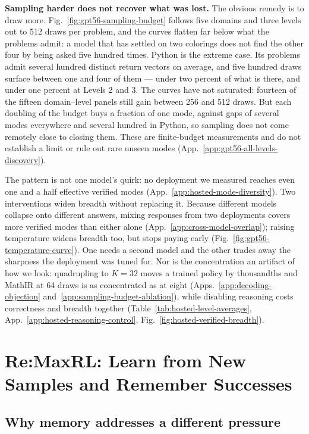 \documentclass{article}
\newcommand{\1}{\mathbf 1}
\theoremstyle{remark}
\theoremstyle{definition}
\theoremstyle{plain}
\begin{document}
\textbf{Sampling harder does not recover what was lost.}
The obvious remedy is to draw more. Fig.~\ref{fig:gpt56-sampling-budget}
follows five domains and three levels out to 512 draws per problem, and the
curves flatten far below what the problems admit: a model that has settled on
two colorings does not find the other four by being asked five hundred times.
Python is the extreme case. Its problems admit several hundred distinct return
vectors on average, and five hundred draws surface between one and four of
them --- under two percent of what is there, and under one percent at
Levels 2 and 3. The curves have not saturated: fourteen of the fifteen
domain--level panels still gain between 256 and 512 draws. But each doubling of
the budget buys a fraction of one mode, against gaps of several modes
everywhere and several hundred in Python, so sampling does not come remotely
close to closing them. These are finite-budget measurements and do not
establish a limit or rule out rare unseen modes
(App.~\ref{app:gpt56-all-levels-discovery}).


The pattern is not one model's quirk: no deployment we measured reaches even
one and a half effective verified modes
(App.~\ref{app:hosted-mode-diversity}). Two interventions widen breadth without
replacing it. Because different models collapse onto different answers, mixing
responses from two deployments covers more verified modes than either alone
(App.~\ref{app:cross-model-overlap}); raising temperature widens breadth too,
but stops paying early (Fig.~\ref{fig:gpt56-temperature-curve}). One needs a
second model and the other trades away the sharpness the deployment was tuned
for. Nor is the concentration an artifact of how we look: quadrupling to $K=32$
moves a trained policy by thousandths and MathIR at 64 draws is as concentrated
as at eight (Apps.~\ref{app:decoding-objection}
and~\ref{app:sampling-budget-ablation}), while disabling reasoning costs
correctness and breadth together
(Table~\ref{tab:hosted-level-averages},
App.~\ref{app:hosted-reasoning-control},
Fig.~\ref{fig:hosted-verified-breadth}).

\section{Re:MaxRL: Learn from New Samples and Remember Successes}
\label{sec:method}

\subsection{Why memory addresses a different pressure}
\label{sec:collapse-mechanism}
\end{document}
